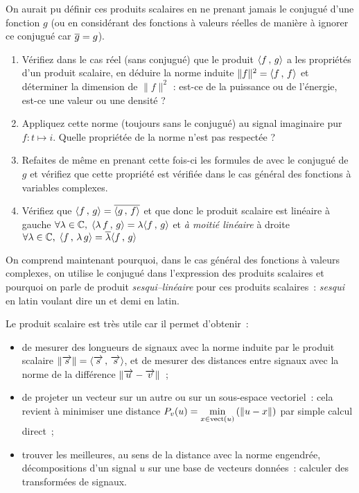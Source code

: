 \begin{exercice}
  On aurait pu définir ces produits scalaires en ne prenant jamais le
  conjugué d'une fonction $g$ (ou en considérant des fonctions à
  valeurs réelles de manière à ignorer ce conjugué car $\overline{g}=g$).
  \begin{enumerate}
  \item Vérifiez dans le cas réel (sans conjugué) que le produit
    $\langle f\,,\,g\rangle$ a les propriétés d'un produit scalaire, en déduire la
    norme induite $\|f\|^2=\langle f\,,\,f\rangle$ et déterminer la dimension de
    $\|f\|^2$ : est-ce de la puissance ou de l'énergie, est-ce une
    valeur ou une densité ?
  \item Appliquez cette norme (toujours sans le conjugué) au signal imaginaire pur
    $f: t\mapsto i$. Quelle propriétée de la norme n'est pas respectée ?
  \item Refaites de même en prenant cette fois-ci les formules de
     avec le conjugué de $g$ et vérifiez que
    cette propriété est vérifiée dans le cas général des fonctions à
    variables complexes.
  \item Vérifiez que $\langle f\,,\,g\rangle=\overline{\langle g\,,\,f\rangle}$ et que donc le produit scalaire est linéaire à gauche $\forall\lambda\in\mathbb{C},\; \langle\lambda\,f\,,\,g\rangle=\lambda\langle f\,,\,g\rangle$ et \emph{à moitié linéaire} à droite $\forall \lambda\in\mathbb{C},\; \langle f\,,\,\lambda\,g\rangle=\overline{\lambda}\langle f\,,\,g\rangle$
  \end{enumerate}
On comprend maintenant pourquoi, dans le cas général des fonctions à valeurs complexes, on utilise le conjugué dans l'expression des produits scalaires et pourquoi on parle de produit \emph{sesqui--linéaire} pour ces produits scalaires~: \emph{sesqui} en latin voulant dire \og{}un et demi\fg{} en latin.  
\end{exercice}

Le produit scalaire est très utile car il permet d'obtenir~:
\begin{itemize}
\item de mesurer des longueurs de signaux avec la norme induite par le produit scalaire $\left\|\overrightarrow{s}\right\|=\langle\overrightarrow{s}\,,\,\overrightarrow{s}\rangle$, et de mesurer des distances entre signaux avec la norme de la différence $\left\|\overrightarrow{u}-\overrightarrow{v}\right\|$~;
\item de projeter un vecteur sur un autre ou sur un sous-espace
  vectoriel~: cela revient à minimiser une distance $P_v(u)=\min\limits_{x\in\mathrm{vect}\left(u\right)}\left(\left\|u-x\right\|\right)$ par simple calcul direct~;
  
\item trouver les meilleures, au sens de la distance avec la norme
  engendrée, décompositions d'un signal $u$ sur une base de vecteurs
  données~: calculer des transformées de signaux.
\end{itemize}

